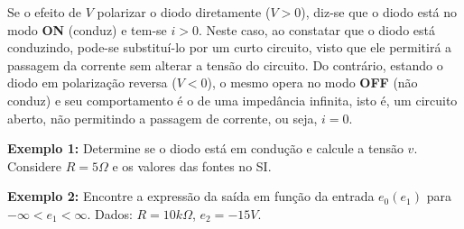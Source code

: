 \documentclass{article}
\numberwithin{equation}{section}
\begin{document}
Se o efeito de $V$ polarizar o diodo diretamente ($V>0$), diz-se que o diodo está no modo \textbf{ON} (conduz) e tem-se $i>0$. Neste caso, ao constatar que o diodo está conduzindo, pode-se substituí-lo por um curto circuito, visto que ele permitirá a passagem da corrente sem alterar a tensão do circuito. Do contrário, estando o diodo em polarização reversa ($V<0$), o mesmo opera no modo \textbf{OFF} (não conduz) e seu comportamento é o de uma impedância infinita, isto é, um circuito aberto, não permitindo a passagem de corrente, ou seja, $i=0$.

\vspace{2mm}

\textbf{Exemplo 1:} Determine se o diodo está em condução e calcule a tensão $v$. Considere $R=5\Omega$ e os valores das fontes no SI.
\begin{center}
\end{center}

\textbf{Exemplo 2:} Encontre a expressão da saída em função da entrada $e_0(e_1)$ para $-\infty < e_1 < \infty$. Dados: $R=10k\Omega$, $e_2=-15V$.
\end{document}
